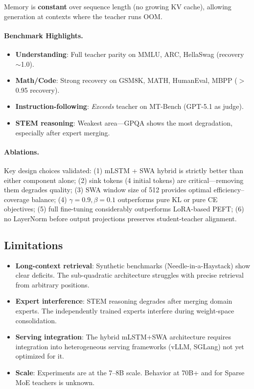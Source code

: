 \documentclass[11pt]{article}
\begin{document}
Memory is \textbf{constant} over sequence length (no growing KV cache), allowing generation at contexts where the teacher runs OOM.

\paragraph{Benchmark Highlights.}
\begin{itemize}
    \item \textbf{Understanding}: Full teacher parity on MMLU, ARC, HellaSwag (recovery $\sim$1.0).
    \item \textbf{Math/Code}: Strong recovery on GSM8K, MATH, HumanEval, MBPP ($>$0.95 recovery).
    \item \textbf{Instruction-following}: \emph{Exceeds} teacher on MT-Bench (GPT-5.1 as judge).
    \item \textbf{STEM reasoning}: Weakest area---GPQA shows the most degradation, especially after expert merging.
\end{itemize}

\paragraph{Ablations.}
Key design choices validated:
(1) mLSTM + SWA hybrid is strictly better than either component alone;
(2) sink tokens (4 initial tokens) are critical---removing them degrades quality;
(3) SWA window size of 512 provides optimal efficiency--coverage balance;
(4) $\gamma=0.9, \beta=0.1$ outperforms pure KL or pure CE objectives;
(5) full fine-tuning considerably outperforms LoRA-based PEFT;
(6) no LayerNorm before output projections preserves student-teacher alignment.

\subsection{Limitations}
\begin{itemize}
    \item \textbf{Long-context retrieval}: Synthetic benchmarks (Needle-in-a-Haystack) show clear deficits. The sub-quadratic architecture struggles with precise retrieval from arbitrary positions.
    \item \textbf{Expert interference}: STEM reasoning degrades after merging domain experts. The independently trained experts interfere during weight-space consolidation.
    \item \textbf{Serving integration}: The hybrid mLSTM+SWA architecture requires integration into heterogeneous serving frameworks (vLLM, SGLang) not yet optimized for it.
    \item \textbf{Scale}: Experiments are at the 7--8B scale. Behavior at 70B+ and for Sparse MoE teachers is unknown.
\end{itemize}
\end{document}
